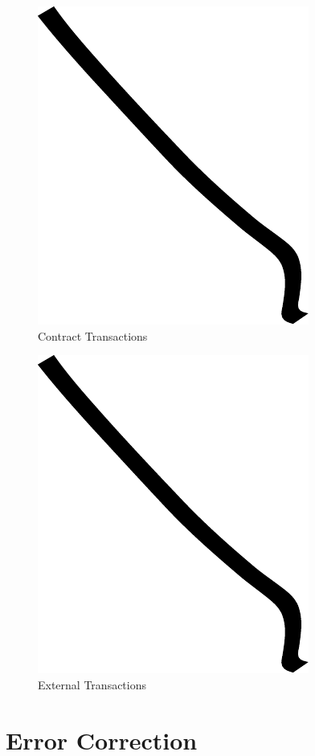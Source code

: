 \begin{figure}
\centering
\includegraphics{img/example.pdf}
\caption{Contract Transactions}
\end{figure}


\begin{figure}
\centering
\includegraphics{img/example.pdf}
\caption{External Transactions}
\end{figure}

\section{Error Correction}

